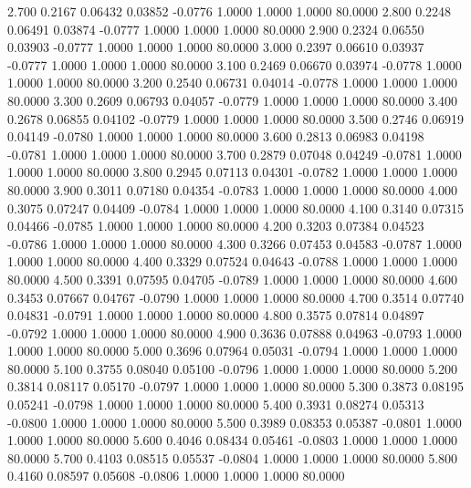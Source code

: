    2.700   0.2167   0.06432   0.03852  -0.0776   1.0000   1.0000   1.0000  80.0000
   2.800   0.2248   0.06491   0.03874  -0.0777   1.0000   1.0000   1.0000  80.0000
   2.900   0.2324   0.06550   0.03903  -0.0777   1.0000   1.0000   1.0000  80.0000
   3.000   0.2397   0.06610   0.03937  -0.0777   1.0000   1.0000   1.0000  80.0000
   3.100   0.2469   0.06670   0.03974  -0.0778   1.0000   1.0000   1.0000  80.0000
   3.200   0.2540   0.06731   0.04014  -0.0778   1.0000   1.0000   1.0000  80.0000
   3.300   0.2609   0.06793   0.04057  -0.0779   1.0000   1.0000   1.0000  80.0000
   3.400   0.2678   0.06855   0.04102  -0.0779   1.0000   1.0000   1.0000  80.0000
   3.500   0.2746   0.06919   0.04149  -0.0780   1.0000   1.0000   1.0000  80.0000
   3.600   0.2813   0.06983   0.04198  -0.0781   1.0000   1.0000   1.0000  80.0000
   3.700   0.2879   0.07048   0.04249  -0.0781   1.0000   1.0000   1.0000  80.0000
   3.800   0.2945   0.07113   0.04301  -0.0782   1.0000   1.0000   1.0000  80.0000
   3.900   0.3011   0.07180   0.04354  -0.0783   1.0000   1.0000   1.0000  80.0000
   4.000   0.3075   0.07247   0.04409  -0.0784   1.0000   1.0000   1.0000  80.0000
   4.100   0.3140   0.07315   0.04466  -0.0785   1.0000   1.0000   1.0000  80.0000
   4.200   0.3203   0.07384   0.04523  -0.0786   1.0000   1.0000   1.0000  80.0000
   4.300   0.3266   0.07453   0.04583  -0.0787   1.0000   1.0000   1.0000  80.0000
   4.400   0.3329   0.07524   0.04643  -0.0788   1.0000   1.0000   1.0000  80.0000
   4.500   0.3391   0.07595   0.04705  -0.0789   1.0000   1.0000   1.0000  80.0000
   4.600   0.3453   0.07667   0.04767  -0.0790   1.0000   1.0000   1.0000  80.0000
   4.700   0.3514   0.07740   0.04831  -0.0791   1.0000   1.0000   1.0000  80.0000
   4.800   0.3575   0.07814   0.04897  -0.0792   1.0000   1.0000   1.0000  80.0000
   4.900   0.3636   0.07888   0.04963  -0.0793   1.0000   1.0000   1.0000  80.0000
   5.000   0.3696   0.07964   0.05031  -0.0794   1.0000   1.0000   1.0000  80.0000
   5.100   0.3755   0.08040   0.05100  -0.0796   1.0000   1.0000   1.0000  80.0000
   5.200   0.3814   0.08117   0.05170  -0.0797   1.0000   1.0000   1.0000  80.0000
   5.300   0.3873   0.08195   0.05241  -0.0798   1.0000   1.0000   1.0000  80.0000
   5.400   0.3931   0.08274   0.05313  -0.0800   1.0000   1.0000   1.0000  80.0000
   5.500   0.3989   0.08353   0.05387  -0.0801   1.0000   1.0000   1.0000  80.0000
   5.600   0.4046   0.08434   0.05461  -0.0803   1.0000   1.0000   1.0000  80.0000
   5.700   0.4103   0.08515   0.05537  -0.0804   1.0000   1.0000   1.0000  80.0000
   5.800   0.4160   0.08597   0.05608  -0.0806   1.0000   1.0000   1.0000  80.0000
